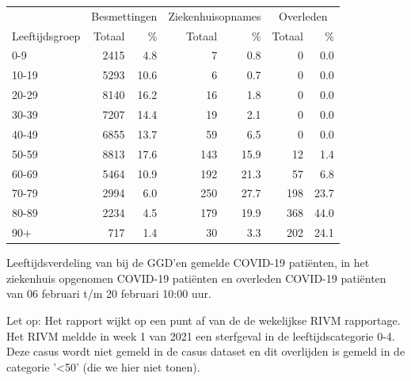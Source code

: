 \documentclass[
  english,
  man,floatsintext]{apa6}
\begin{document}
\begin{table}[H]
\centering\begingroup\fontsize{11}{13}\selectfont

\begin{threeparttable}
\begin{tabular}{lrrrrrr}
\toprule
\multicolumn{1}{c}{ } & \multicolumn{2}{c}{Besmettingen} & \multicolumn{2}{c}{Ziekenhuisopnames} & \multicolumn{2}{c}{Overleden} \\
\cmidrule(l{3pt}r{3pt}){2-3} \cmidrule(l{3pt}r{3pt}){4-5} \cmidrule(l{3pt}r{3pt}){6-7}
Leeftijdsgroep & Totaal & \% & Totaal & \% & Totaal & \%\\
\midrule
0-9 & 2415 & 4.8 & 7 & 0.8 & 0 & 0.0\\
10-19 & 5293 & 10.6 & 6 & 0.7 & 0 & 0.0\\
20-29 & 8140 & 16.2 & 16 & 1.8 & 0 & 0.0\\
30-39 & 7207 & 14.4 & 19 & 2.1 & 0 & 0.0\\
40-49 & 6855 & 13.7 & 59 & 6.5 & 0 & 0.0\\
50-59 & 8813 & 17.6 & 143 & 15.9 & 12 & 1.4\\
60-69 & 5464 & 10.9 & 192 & 21.3 & 57 & 6.8\\
70-79 & 2994 & 6.0 & 250 & 27.7 & 198 & 23.7\\
80-89 & 2234 & 4.5 & 179 & 19.9 & 368 & 44.0\\
90+ & 717 & 1.4 & 30 & 3.3 & 202 & 24.1\\
\bottomrule
\end{tabular}
\begin{tablenotes}
\item[1] Leeftijdsverdeling van bij de GGD’en gemelde COVID-19 patiënten, in het ziekenhuis opgenomen COVID-19 patiënten en overleden COVID-19 patiënten van 06 februari t/m 20 februari 10:00 uur.
\item[2] Let op: Het rapport wijkt op een punt af van de de wekelijkse RIVM rapportage. Het RIVM meldde in week 1 van 2021 een sterfgeval in de leeftijdscategorie 0-4. Deze casus wordt niet gemeld in de casus dataset en dit overlijden is gemeld in de categorie '<50' (die we hier niet tonen).
\end{tablenotes}
\end{threeparttable}
\endgroup{}
\end{table}

\newpage
\end{document}
